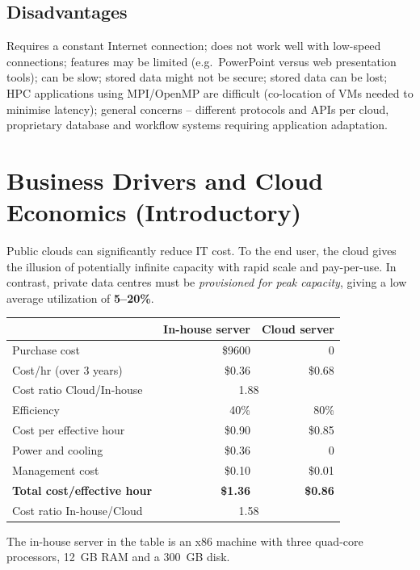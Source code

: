 \subsection{Disadvantages}
Requires a constant Internet connection; does not work well with low-speed connections; features may be
limited (e.g.\ PowerPoint versus web presentation tools); can be slow; stored data might not be secure;
stored data can be lost; HPC applications using MPI/OpenMP are difficult (co-location of VMs needed to
minimise latency); general concerns -- different protocols and APIs per cloud, proprietary database and
workflow systems requiring application adaptation.

\section{Business Drivers and Cloud Economics (Introductory)}
Public clouds can significantly reduce IT cost. To the end user, the cloud gives the illusion of
potentially infinite capacity with rapid scale and pay-per-use. In contrast, private data centres must be
\emph{provisioned for peak capacity}, giving a low average utilization of \textbf{5--20\%}.

\begin{center}
\begin{tabular}{lrr}
\toprule
 & In-house server & Cloud server\\
\midrule
Purchase cost & \$9600 & 0\\
Cost/hr (over 3 years) & \$0.36 & \$0.68\\
Cost ratio Cloud/In-house & \multicolumn{2}{c}{1.88}\\
Efficiency & 40\% & 80\%\\
Cost per effective hour & \$0.90 & \$0.85\\
Power and cooling & \$0.36 & 0\\
Management cost & \$0.10 & \$0.01\\
\textbf{Total cost/effective hour} & \textbf{\$1.36} & \textbf{\$0.86}\\
Cost ratio In-house/Cloud & \multicolumn{2}{c}{1.58}\\
\bottomrule
\end{tabular}
\end{center}
The in-house server in the table is an x86 machine with three quad-core processors, 12~GB RAM and a 300~GB disk.

